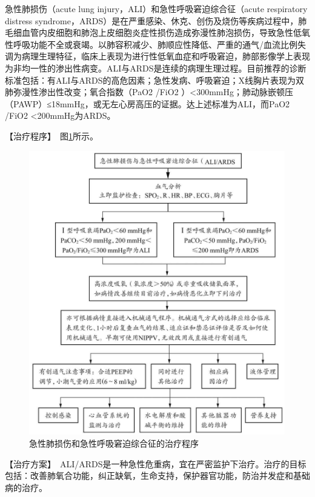 急性肺损伤（acute lung injury，ALI）和急性呼吸窘迫综合征（acute
respiratory distress
syndrome，ARDS）是在严重感染、休克、创伤及烧伤等疾病过程中，肺毛细血管内皮细胞和肺泡上皮细胞炎症性损伤造成弥漫性肺泡损伤，导致急性低氧性呼吸功能不全或衰竭。以肺容积减少、肺顺应性降低、严重的通气/血流比例失调为病理生理特征，临床上表现为进行性低氧血症和呼吸窘迫，肺部影像学上表现为非均一性的渗出性病变。ALI与ARDS是连续的病理生理过程。目前推荐的诊断标准包括：有ALI与ARDS的高危因素；急性发病、呼吸窘迫；X线胸片表现为双肺弥漫性渗出性改变；氧合指数（PaO{2}
/FiO{2}
）\textless{}300mmHg；肺动脉嵌顿压（PAWP）≤18mmHg，或无左心房高压的证据。达上述标准为ALI，而PaO{2}
/FiO{2} \textless{}200mmHg为ARDS。

【治疗程序】　图\ref{fig1-17-1}所示。

\begin{figure}[!htbp]
 \centering
 \includegraphics{./images/Image00040.jpg}
 \captionsetup{justification=centering}
 \caption{急性肺损伤和急性呼吸窘迫综合征的治疗程序}
 \label{fig1-17-1}
  \end{figure} 

【治疗方案】　ALI/ARDS是一种急性危重病，宜在严密监护下治疗。治疗的目标包括：改善肺氧合功能，纠正缺氧，生命支持，保护器官功能，防治并发症和基础病的治疗。

